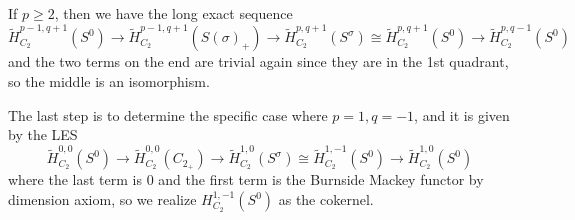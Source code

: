 \documentclass{article}
\theoremstyle{definition}
\theoremstyle{definition}
\theoremstyle{definition}
\theoremstyle{definition}
\theoremstyle{definition}
\theoremstyle{definition}
\theoremstyle{definition}
\begin{document}
If $p\geq 2$, then we have the long exact sequence 
\[\tilde{H}_{C_2}^{p-1,q+1}(S^0)\to \tilde{H}_{C_2}^{p-1,q+1}(S({\sigma})_+)\to \tilde{H}_{C_2}^{p,q+1}(S^{\sigma})\cong \tilde{H}_{C_2}^{p,q+1}(S^0) \to \tilde{H}_{C_2}^{p,q-1}(S^0) \]
and the two terms on the end are trivial again since they are in the 1st quadrant, so the middle is an isomorphism. 

The last step is to determine the specific case where $p=1,q=-1$, and it is given by the LES
\[\tilde{H}_{C_2}^{0,0}(S^0)\to  \tilde{H}_{C_2}^{0,0}(C_{2_+})\to \tilde{H}_{C_2}^{1,0}(S^{\sigma})\cong \tilde{H}_{C_2}^{1,-1}(S^0)\to  \tilde{H}_{C_2}^{1,0}(S^0)\]
where the last term is $0$ and the first term is the Burnside Mackey functor by dimension axiom, so we realize $H_{C_2}^{1,-1}(S^0)$ as the cokernel. 
\end{document}
